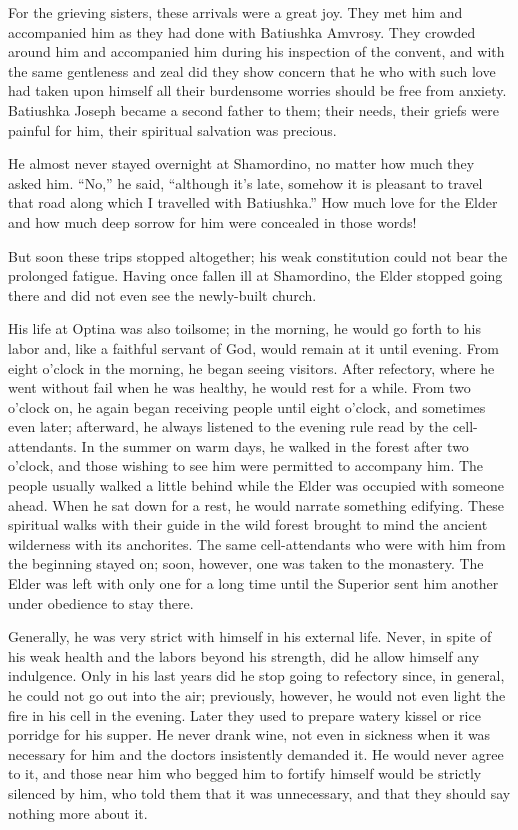 For the grieving sisters, these arrivals were a great joy. They met him and accompanied him as they had done with Batiushka Amvrosy. They crowded around him and accompanied him during his inspection of the convent, and with the same gentleness and zeal did they show concern that he who with such love had taken upon himself all their burdensome worries should be free from anxiety. Batiushka Joseph became a second father to them; their needs, their griefs were painful for him, their spiritual salvation was precious.

He almost never stayed overnight at Shamordino, no matter how much they asked him. ``No,'' he said, ``although it's late, somehow it is pleasant to travel that road along which I travelled with Batiushka.'' How much love for the Elder and how much deep sorrow for him were concealed in those words!

But soon these trips stopped altogether; his weak constitution could not bear the prolonged fatigue. Having once fallen ill at Shamordino, the Elder stopped going there and did not even see the newly-built church.

His life at Optina was also toilsome; in the morning, he would go forth to his labor and, like a faithful servant of God, would remain at it until evening. From eight o'clock in the morning, he began seeing visitors. After refectory, where he went without fail when he was healthy, he would rest for a while. From two o'clock on, he again began receiving people until eight o'clock, and sometimes even later; afterward, he always listened to the evening rule read by the cell-attendants. In the summer on warm days, he walked in the forest after two o'clock, and those wishing to see him were permitted to accompany him. The people usually walked a little behind while the Elder was occupied with someone ahead. When he sat down for a rest, he would narrate something edifying. These spiritual walks with their guide in the wild forest brought to mind the ancient wilderness with its anchorites. The same cell-attendants who were with him from the beginning stayed on; soon, however, one was taken to the monastery. The Elder was left with only one for a long time until the Superior sent him another under obedience to stay there.

Generally, he was very strict with himself in his external life. Never, in spite of his weak health and the labors beyond his strength, did he allow himself any indulgence. Only in his last years did he stop going to refectory since, in general, he could not go out into the air; previously, however, he would not even light the fire in his cell in the evening. Later they used to prepare watery kissel or rice porridge for his supper. He never drank wine, not even in sickness when it was necessary for him and the doctors insistently demanded it. He would never agree to it, and those near him who begged him to fortify himself would be strictly silenced by him, who told them that it was unnecessary, and that they should say nothing more about it.

